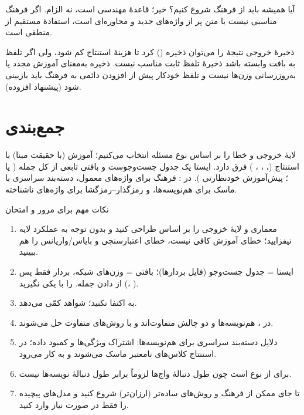 \begin{exambox}{آیا همیشه باید از فرهنگ شروع کنیم؟}
خیر؛ قاعدهٔ مهندسی است، نه الزام. اگر فرهنگ مناسبی نیست یا متن پر از واژه‌های جدید و محاوره‌ای است، استفادهٔ مستقیم از  منطقی است.
\end{exambox}

\begin{correctionbox}{ذخیرهٔ خروجی }
نتیجهٔ  را می‌توان ذخیره () کرد تا هزینهٔ استنتاج کم شود، ولی اگر تلفظ به بافت وابسته باشد ذخیرهٔ تلفظ ثابت مناسب نیست. ذخیره به‌معنای آموزش مجدد یا به‌روزرسانی وزن‌ها نیست و تلفظ خودکار پیش از افزودن دائمی به فرهنگ باید بازبینی شود (پیشنهاد افزوده).
\end{correctionbox}

\section{جمع‌بندی}

لایهٔ خروجی و خطا را بر اساس نوع مسئله انتخاب می‌کنیم؛ آموزش (با حقیقت مبنا) با استنتاج (، ، ، ) فرق دارد.  ایستا یک جدول جست‌وجوست و بافتی تابعی از کل جمله ( یا ؛ پیش‌آموزش خودنظارتی ). در : فرهنگ برای واژه‌های معمول، دسته‌بند سراسری با ماسک برای هم‌نویسه‌ها، و  رمزگذار–رمزگشا برای واژه‌های ناشناخته.

\begin{exambox}{نکات مهم برای مرور و امتحان}
\begin{enumerate}
  \item معماری و لایهٔ خروجی را بر اساس  طراحی کنید و بدون توجه به عملکرد لایه نیفزایید؛ خطای آموزش کافی نیست، خطای اعتبارسنجی و بایاس/واریانس را هم ببینید.
  \item ایستا = جدول جست‌وجو (فایل بردارها)؛ بافتی = وزن‌های شبکه، بردار فقط پس از دادن جمله.  را با  یکی نگیرید (، ).
  \item به  اکتفا نکنید؛  شواهد کمّی می‌دهد.
  \item در ، هم‌نویسه‌ها و  دو چالش متفاوت‌اند و با روش‌های متفاوت حل می‌شوند.
  \item دلایل دسته‌بند سراسری برای هم‌نویسه‌ها: اشتراک ویژگی‌ها و کمبود داده؛ در استنتاج کلاس‌های نامعتبر ماسک می‌شوند و  به کار می‌رود.
  \item {} برای  از نوع  است چون طول دنبالهٔ واج‌ها لزوماً برابر طول دنبالهٔ نویسه‌ها نیست.
  \item تا جای ممکن از فرهنگ و روش‌های ساده‌تر (ارزان‌تر) شروع کنید و مدل‌های پیچیده را فقط در صورت نیاز وارد کنید.
\end{enumerate}
\end{exambox}
